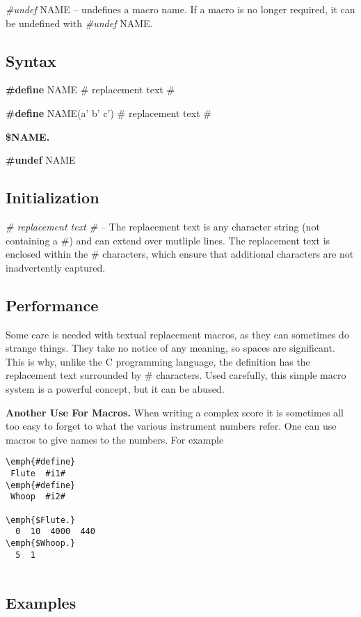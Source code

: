  \emph{\#undef}
 NAME -- undefines a macro name. If a macro is no longer required, it can be undefined with \emph{\#undef}
 NAME. 
\subsection*{Syntax}


 \textbf{\#define}
 NAME \# replacement text \#


 \textbf{\#define}
 NAME(a' b' c') \# replacement text \#


 \textbf{\$NAME.}



 \textbf{\#undef}
 NAME
\subsection*{Initialization}


 \emph{\# replacement text \#}
 -- The replacement text is any character string (not containing a \#) and can extend over mutliple lines. The replacement text is enclosed within the \# characters, which ensure that additional characters are not inadvertently captured. 
\subsection*{Performance}


  Some care is needed with textual replacement macros, as they can sometimes do strange things. They take no notice of any meaning, so spaces are significant. This is why, unlike the C programming language, the definition has the replacement text surrounded by \# characters. Used carefully, this simple macro system is a powerful concept, but it can be abused. 


 \textbf{Another Use For Macros. }
 When writing a complex score it is sometimes all too easy to forget to what the various instrument numbers refer. One can use macros to give names to the numbers. For example 


 
\begin{lstlisting}
\emph{#define}
 Flute  #i1#
\emph{#define}
 Whoop  #i2#

\emph{$Flute.}
  0  10  4000  440
\emph{$Whoop.}
  5  1
          
\end{lstlisting}


 
\subsection*{Examples}


